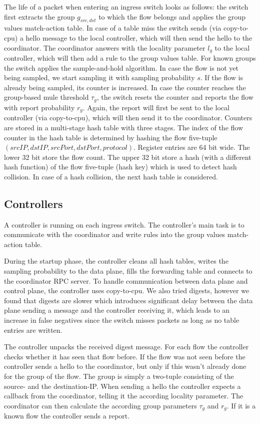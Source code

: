 \documentclass[11pt,oneside,a4paper]{article}
\begin{document}
The life of a packet when entering an ingress switch looks as follows: the switch first extracts the group $g_{src,dst}$ to which the flow belongs and applies the group values match-action table. In case of a table miss the switch sends (via copy-to-cpu) a hello message to the local controller, which will then send the hello to the coordinator. The coordinator answers with the locality parameter $l_g$ to the local controller, which will then add a rule to the group values table. For known groups the switch applies the sample-and-hold algorithm. In case the flow is not yet being sampled, we start sampling it with sampling probability $s$. If the flow is already being sampled, its counter is increased. In case the counter reaches the group-based mule threshold $\tau_g$, the switch resets the counter and reports the flow with report probability $r_g$. Again, the report will first be sent to the local controller (via copy-to-cpu), which will then send it to the coordinator. Counters are stored in a multi-stage hash table with three stages. The index of the flow counter in the hash table is determined by hashing the flow five-tuple $(srcIP, dstIP, srcPort, dstPort, protocol)$. Register entries are 64 bit wide. The lower 32 bit store the flow count. The upper 32 bit store a hash (with a different hash function) of the flow five-tuple (hash key) which is used to detect hash collision. In case of a hash collision, the next hash table is considered.

\subsection{Controllers} \label{controller}

A controller is running on each ingress switch. The controller's main task is to communicate with the coordinator and write rules into the group values match-action table.

During the startup phase, the controller cleans all hash tables, writes the sampling probability to the data plane, fills the forwarding table and connects to the coordinator RPC server. To handle communication between data plane and control plane, the controller uses copy-to-cpu. We also tried digests, however we found that digests are slower which introduces significant delay between the data plane sending a message and the controller receiving it, which leads to an increase in false negatives since the switch misses packets as long as no table entries are written.

The controller unpacks the received digest message. For each flow the controller checks whether it has seen that flow before. If the flow was not seen before the controller sends a hello to the coordinator, but only if this wasn't already done for the group of the flow. The group is simply a two-tuple consisting of the source- and the destination-IP. When sending a hello the controller expects a callback from the coordinator, telling it the according locality parameter. The coordinator can then calculate the according group parameters $\tau_g$ and $r_g$. If it is a known flow the controller sends a report. %
\end{document}
